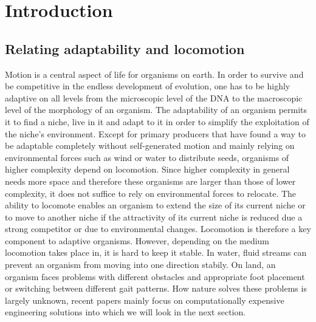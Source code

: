 \documentclass[main]{subfiles}
\begin{document}
\setcounter{chapter}{0}

\chapter{Introduction} %

\label{Chapter\thechapter} %


\section{Relating adaptability and locomotion}

Motion is a central aspect of life for organisms on earth. In order to survive and be competitive in the endless development of evolution, one has to be highly adaptive on all levels from the microscopic level of the DNA to the macroscopic level of the morphology of an organism. The adaptability of an organism permits it to find a niche, live in it and adapt to it in order to simplify the exploitation of the niche's environment. Except for primary producers that have found a way to be adaptable completely without self-generated motion and mainly relying on environmental forces such as wind or water to distribute seeds, organisms of higher complexity depend on locomotion. Since higher complexity in general needs more space and therefore these organisms are larger than those of lower complexity, it does not suffice to rely on environmental forces to relocate. The ability to locomote enables an organism to extend the size of its current niche or to move to another niche if the attractivity of its current niche is reduced due a strong competitor or due to environmental changes. Locomotion is therefore a key component to adaptive organisms. However, depending on the medium locomotion takes place in, it is hard to keep it stable. In water, fluid streams can prevent an organism from moving into one direction stabily. On land, an organism faces problems with different obstacles and appropriate foot placement or switching between different gait patterns. How nature solves these problems is largely unknown, recent papers mainly focus on computationally expensive engineering solutions into which we will look in the next section.
\end{document}
